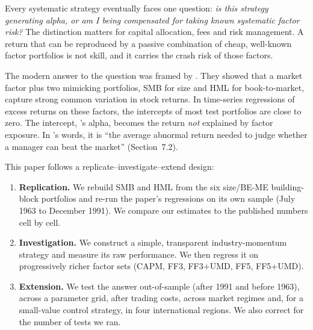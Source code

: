 \documentclass[11pt]{article}
\begin{document}
Every systematic strategy eventually faces one question: \emph{is this strategy generating alpha, or am I being compensated for taking known systematic factor risk?} The distinction matters for capital allocation, fees and risk management. A return that can be reproduced by a passive combination of cheap, well-known factor portfolios is not skill, and it carries the crash risk of those factors.

The modern answer to the question was framed by \citet{FF1993}. They showed that a market factor plus two mimicking portfolios, SMB for size and HML for book-to-market, capture strong common variation in stock returns. In time-series regressions of excess returns on these factors, the intercepts of most test portfolios are close to zero. The intercept, \citeauthor{Jensen1968}'s alpha, becomes the return \emph{not} explained by factor exposure. In \citeauthor{FF1993}'s words, it is ``the average abnormal return needed to judge whether a manager can beat the market'' (Section~7.2).

This paper follows a replicate--investigate--extend design:
\begin{enumerate}
  \item \textbf{Replication.} We rebuild SMB and HML from the six size/BE-ME building-block portfolios and re-run the paper's regressions on its own sample (July 1963 to December 1991). We compare our estimates to the published numbers cell by cell.
  \item \textbf{Investigation.} We construct a simple, transparent industry-momentum strategy and measure its raw performance. We then regress it on progressively richer factor sets (CAPM, FF3, FF3+UMD, FF5, FF5+UMD).
  \item \textbf{Extension.} We test the answer out-of-sample (after 1991 and before 1963), across a parameter grid, after trading costs, across market regimes and, for a small-value control strategy, in four international regions. We also correct for the number of tests we ran.
\end{enumerate}
\end{document}
